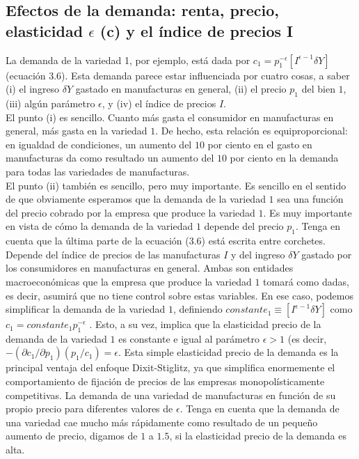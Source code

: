 \subsection{\boldmath Efectos de la demanda: renta, precio, elasticidad $\epsilon$ (c) y el índice de precios I}
La demanda de la variedad 1, por ejemplo, está dada por $c_1 = p_1^{-\epsilon} \left[I^{\epsilon-1} \delta Y\right]$ (ecuación 3.6). Esta demanda parece estar influenciada por cuatro cosas, a saber (i) el ingreso $\delta Y$ gastado en manufacturas en general, (ii) el precio $p_1$ del bien $1$, (iii) algún parámetro $\epsilon$, y (iv) el índice de precios $I$. \\
El punto (i) es sencillo. Cuanto más gasta el consumidor en manufacturas en general, más gasta en la variedad $1$. De hecho, esta relación es equiproporcional: en igualdad de condiciones, un aumento del $10$ por ciento en el gasto en manufacturas da como resultado un aumento del $10$ por ciento en la demanda para todas las variedades de manufacturas.\\
El punto (ii) también es sencillo, pero muy importante. Es sencillo en el sentido de que obviamente esperamos que la demanda de la variedad $1$ sea una función del precio cobrado por la empresa que produce la variedad $1$. Es muy importante en vista de cómo la demanda de la variedad $1$ depende del precio $p_1$. Tenga en cuenta que la última parte de la ecuación (3.6) está escrita entre corchetes. Depende del índice de precios de las manufacturas $I$ y del ingreso $\delta Y$ gastado por los consumidores en manufacturas en general. Ambas son entidades macroeconómicas que la empresa que produce la variedad $1$ tomará como dadas, es decir, asumirá que no tiene control sobre estas variables. En ese caso, podemos simplificar la demanda de la variedad $1$, definiendo $constante_1 \equiv [I^{\epsilon-1} \delta Y]$ como $c_1 = constante_1 p_1^{-\epsilon}$ . Esto, a su vez, implica que la elasticidad precio de la demanda de la variedad $1$ es constante e igual al parámetro $\epsilon > 1$ (es decir, $-\left(\partial c_1/\partial p_1\right)\left(p_1/c_1\right)=\epsilon$. Esta simple elasticidad precio de la demanda es la principal ventaja del enfoque Dixit-Stiglitz, ya que simplifica enormemente el comportamiento de fijación de precios de las empresas monopolísticamente competitivas. La demanda de una variedad de manufacturas en función de su propio precio para diferentes valores de $\epsilon$. Tenga en cuenta que la demanda de una variedad cae mucho más rápidamente como resultado de un pequeño aumento de precio, digamos de $1$ a $1.5$, si la elasticidad precio de la demanda es alta.\\
